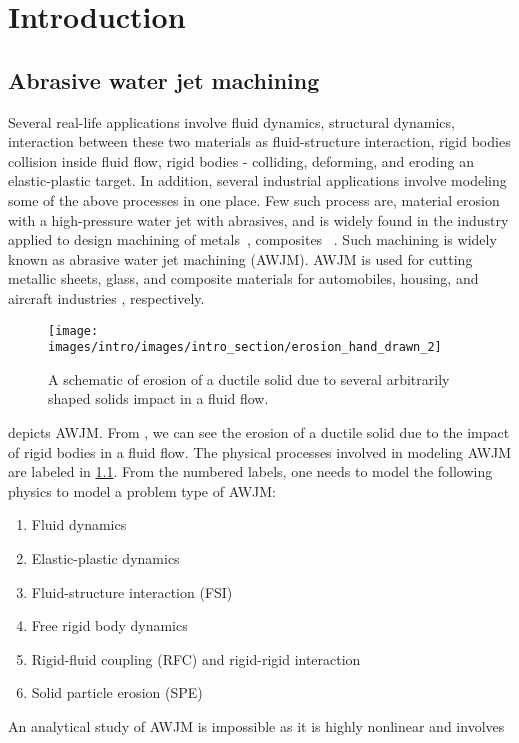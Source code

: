 \chapter{Introduction}
\label{chap:SPH}
\section{Abrasive water jet machining}
Several real-life applications involve fluid dynamics, structural dynamics,
interaction between these two materials as fluid-structure interaction, rigid
bodies collision inside fluid flow, rigid bodies - colliding, deforming, and
eroding an elastic-plastic target. In addition, several industrial
applications involve modeling some of the above processes in one place. Few such
process are, material erosion with a high-pressure water jet with abrasives, and
is widely found in the industry applied to design machining of
metals~\citep{llanto_recent_2021}, composites~ \cite{alberdi_composite_2013}.
Such machining is widely known as abrasive water jet machining (AWJM). AWJM is
used for cutting metallic sheets, glass, and composite materials for
automobiles, housing, and aircraft industries
\citep{alberdi_composite_2013,aich_abrasive_2014,llanto_recent_2021},
respectively.
\begin{figure}
  \centering
  \texttt{[image: images/intro/images/intro\_section/erosion\_hand\_drawn\_2]}
  \caption{A schematic of erosion of a ductile solid due to several arbitrarily
    shaped solids impact in a fluid flow.}
\label{fig:intro-big-picture}
\end{figure}
 depicts AWJM. From , we
can see the erosion of a ductile solid due to the impact of rigid bodies in a
fluid flow. The physical processes involved in modeling AWJM are labeled in
\cref{fig:intro-big-picture}. From the numbered labels, one needs to model the
following physics to model a problem type of AWJM:
\begin{enumerate}
\item Fluid dynamics
\item Elastic-plastic dynamics
\item Fluid-structure interaction (FSI)
\item Free rigid body dynamics
\item Rigid-fluid coupling (RFC) and rigid-rigid interaction
\item Solid particle erosion (SPE)
\end{enumerate}
An analytical study of AWJM is impossible as it is highly nonlinear and involves
